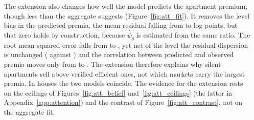 The extension also changes how well the model predicts the apartment premium, though less than the aggregate suggests (Figure~\ref{fig:att_fit}). It removes the level bias in the predicted premia, the mean residual falling from \attResidCoreApt{} to \attResidExtApt{} log points, but that zero holds by construction, because $\hat\psi_\delta$ is estimated from the same ratio. The root mean squared error falls from \attRmseCoreApt{} to \attRmseExtApt{}, yet net of the level the residual dispersion is unchanged (\attSdResidCoreApt{} against \attSdResidExtApt{}) and the correlation between predicted and observed premia moves only from \attCorrCoreApt{} to \attCorrExtApt{}. The extension therefore explains why silent apartments sell above verified efficient ones, not which markets carry the largest premia. In houses the two models coincide. The evidence for the extension rests on the ceilings of Figures~\ref{fig:att_belief} and~\ref{fig:att_ceilings} (the latter in Appendix~\ref{app:attention}) and the contrast of Figure~\ref{fig:att_contrast}, not on the aggregate fit.
